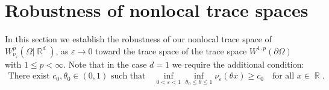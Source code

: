\documentclass[12pt, reqno]{amsart}%
\theoremstyle{plain}  %
\theoremstyle{definition}  %
\numberwithin{equation}{section}
\DeclareMathOperator{\R}{\mathbb{R}}
\newcommand{\eps}{\varepsilon}
\newcommand{\WnuOmRa}{W^p_{\nu_\eps}(\Omega|\R^d )}
\begin{document}
\vspace{-1ex}
\section{Robustness of  nonlocal trace spaces} \label{sec:robust-trace}
In this section we establish the robustness of  our nonlocal trace space of $\WnuOmRa$, as $\eps\to0$ toward the trace space of the trace space $W^{1 ,p}(\partial\Omega)$ with $1\leq p<\infty$. Note that in the case $d=1$ we require the additional condition:
\begin{align*}
\text{There exist $c_0, \theta_0 \in (0,1)$ such that}
\quad
\inf_{0 < \varepsilon < 1} \inf_{\theta_0 \leq \theta \leq 1} \nu_\varepsilon(\theta x) \geq c_0
\quad \text{for all } x \in \R.
\end{align*}
\end{document}
